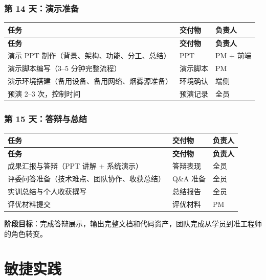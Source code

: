 \documentclass[UTF8,12pt,a4paper]{ctexart}
\begin{document}
\subsubsection{第 14 天：演示准备}

\begin{longtable}{L{6cm}L{4.5cm}C{2.5cm}}
\toprule
\textbf{任务} & \textbf{交付物} & \textbf{负责人} \\
\midrule
\endfirsthead
\toprule
\textbf{任务} & \textbf{交付物} & \textbf{负责人} \\
\midrule
\endhead
\bottomrule
\endfoot

演示 PPT 制作（背景、架构、功能、分工、总结） & PPT & PM + 前端 \\
\midrule
演示脚本编写（3--5 分钟完整流程） & 演示脚本 & PM \\
\midrule
演示环境搭建（备用设备、备用网络、烟雾源准备） & 环境确认 & 端侧 \\
\midrule
预演 2--3 次，控制时间 & 预演记录 & 全员 \\
\bottomrule
\end{longtable}

\subsubsection{第 15 天：答辩与总结}

\begin{longtable}{L{6cm}L{4.5cm}C{2.5cm}}
\toprule
\textbf{任务} & \textbf{交付物} & \textbf{负责人} \\
\midrule
\endfirsthead
\toprule
\textbf{任务} & \textbf{交付物} & \textbf{负责人} \\
\midrule
\endhead
\bottomrule
\endfoot

成果汇报与答辩（PPT 讲解 + 系统演示） & 答辩表现 & 全员 \\
\midrule
评委问答准备（技术难点、团队协作、收获总结） & Q\&A 准备 & 全员 \\
\midrule
实训总结与个人收获撰写 & 总结报告 & 全员 \\
\midrule
评优材料提交 & 评优材料 & PM \\
\bottomrule
\end{longtable}

\textbf{阶段目标}：完成答辩展示，输出完整文档和代码资产，团队完成从学员到准工程师的角色转变。

\section{敏捷实践}
\end{document}
